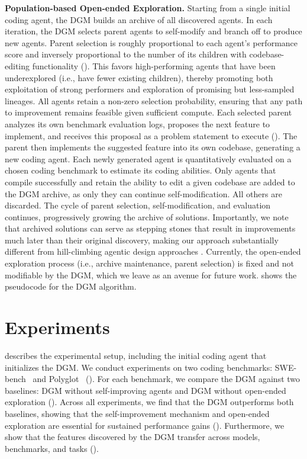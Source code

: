\documentclass{article} %
\begin{document}
\textbf{Population-based Open-ended Exploration.}
Starting from a single initial coding agent, the DGM builds an archive of all discovered agents. In each iteration, the DGM selects parent agents to self-modify and branch off to produce new agents. Parent selection is roughly proportional to each agent's performance score and inversely proportional to the number of its children with codebase-editing functionality (). This favors high-performing agents that have been underexplored (i.e., have fewer existing children), thereby promoting both exploitation of strong performers and exploration of promising but less-sampled lineages. All agents retain a non-zero selection probability, ensuring that any path to improvement remains feasible given sufficient compute. 
Each selected parent analyzes its own benchmark evaluation logs, proposes the next feature to implement, and receives this proposal as a problem statement to execute (). The parent then implements the suggested feature into its own codebase, generating a new coding agent. Each newly generated agent is quantitatively evaluated on a chosen coding benchmark to estimate its coding abilities. Only agents that compile successfully and retain the ability to edit a given codebase are added to the DGM archive, as only they can continue self-modification. All others are discarded. The cycle of parent selection, self-modification, and evaluation continues, progressively growing the archive of solutions. Importantly, we note that archived solutions can serve as stepping stones that result in improvements much later than their original discovery, making our approach substantially different from hill-climbing agentic design approaches \citep{robeyns2025self}. Currently, the open-ended exploration process (i.e., archive maintenance, parent selection) is fixed and not modifiable by the DGM, which we leave as an avenue for future work.  shows the pseudocode for the DGM algorithm.

\section{Experiments}
\label{sec:experiments}

 describes the experimental setup, including the initial coding agent that initializes the DGM. We conduct experiments on two coding benchmarks: SWE-bench~\citep{jimenez2024swebench} and Polyglot~\citep{gauthier2024polyglot} (). For each benchmark, we compare the DGM against two baselines: DGM without self-improving agents and DGM without open-ended exploration (). Across all experiments, we find that the DGM outperforms both baselines, showing that the self-improvement mechanism and open-ended exploration are essential for sustained performance gains (). Furthermore, we show that the features discovered by the DGM transfer across models, benchmarks, and tasks ().
\end{document}
